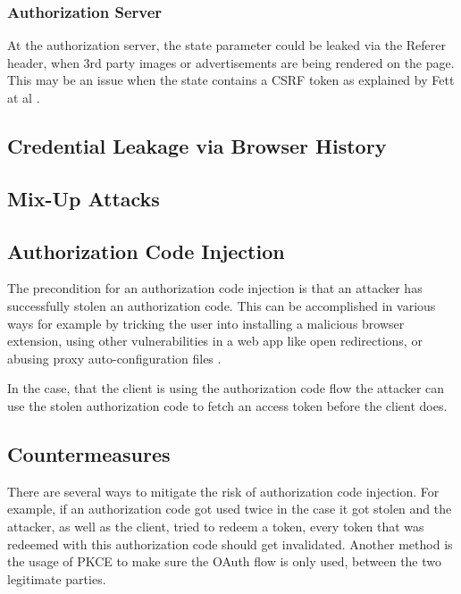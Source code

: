 \documentclass[
    fontsize=12pt,
    headings=small,
    parskip=half,           %
    bibliography=totoc,
    numbers=noenddot,       %
    open=any,               %
    ]{scrreprt}
\begin{document}
\subsubsection{Authorization Server}
At the authorization server, the state parameter could be leaked via the
Referer header, when 3rd party images or advertisements are being rendered on
the page. This may be an issue when the state contains a CSRF token as
explained by Fett at al \cite{fett2016comprehensive}.


\subsection{Credential Leakage via Browser History}

\subsection{Mix-Up Attacks}

\subsection{Authorization Code Injection \cite{philippaerts2022oauch}} 
The precondition for an authorization code injection is that an attacker has
successfully stolen an authorization code. This can be accomplished in various
ways for example by tricking the user into installing a malicious browser
extension, using other vulnerabilities in a web app like open redirections, or
abusing proxy auto-configuration files \cite*{philippaerts2022oauch}.

In the case, that the client is using the authorization code flow the attacker
can use the stolen authorization code to fetch an access token before the
client does.

\subsection{Countermeasures}
There are several ways to mitigate the risk of authorization code injection.
For example, if an authorization code got used twice in the case it got stolen
and the attacker, as well as the client, tried to redeem a token, every token
that was redeemed with this authorization code should get invalidated. Another
method is the usage of PKCE to make sure the OAuth flow is only used, between
the two legitimate parties.
\end{document}
